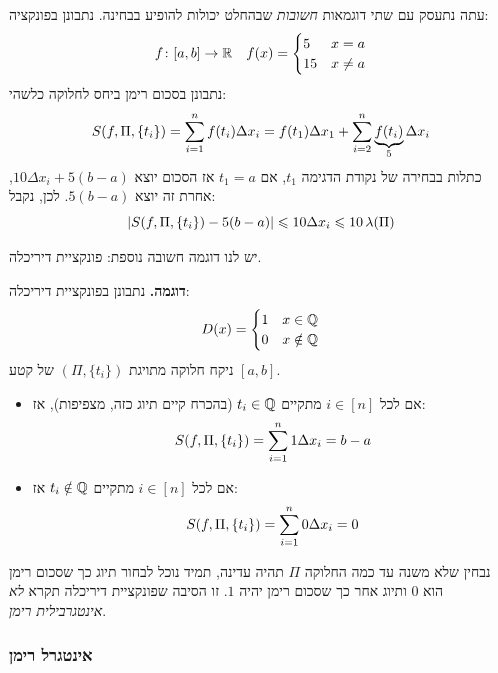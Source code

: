 \documentclass[name=רשימות חדו''א 2א]{../../../tex/classes/noChapterMegasumPreamble}
\begin{document}
	עתה נתעסק עם שתי דוגמאות \textit{חשובות} שבהחלט יכולות להופיע בבחינה. נתבונן בפונקציה:
	\begin{align*}
		f \colon [a, b] \to \mathbb{R} && f(x) = \begin{cases}
			5 & x = a \\
			15 & x \neq a
		\end{cases}
	\end{align*}
	נתבונן בסכום רימן ביחס לחלוקה כלשהי:
	\[ S(f, \Pi, \{t_i\}) = \sum_{i = 1}^{n}f(t_i)\Delta x_i = f(t_1)\Delta x_1 + \sum_{i = 2}^{n}\underbrace{f(t_i)}_{5}\Delta x_i \]
	כתלות בבחירה של נקודת הדגימה $t_1$, אם $t_1= a$ אז הסכום יוצא $10 \Delta x_i + 5(b - a)$, אחרת זה יוצא $5(b - a)$. לכן, נקבל:
	\[ \left \lvert S(f, \Pi, \{t_i\}) - 5(b - a) \right \rvert \leqslant 10 \Delta x_i \leqslant 10 \, \lambda(\Pi) \]

	יש לנו דוגמה חשובה נוספת: פונקציית דיריכלה. 

	\textbf{דוגמה. }נתבונן בפונקציית דיריכלה:
	\[ D(x) = \begin{cases}
		1 & x \in \mathbb{Q} \\
		0 & x \notin \mathbb{Q}
	\end{cases} \]
	ניקח חלוקה מתויגת $(\Pi, \{t_i\})$ של קטע $[a, b]$.
	\begin{itemize}
		\item אם לכל $i \in [n]$ מתקיים $t_i \in \mathbb{Q}$ (בהכרח קיים תיוג כזה, מצפיפות), אז:
		\[ S(f, \Pi, \{t_i\}) = \sum_{i = 1}^{n} 1 \Delta x_i = b - a \]
		\item אם לכל $i \in [n]$ מתקיים $t_i \notin \mathbb{Q}$ אז:
		\[ S(f, \Pi, \{t_i\}) = \sum_{i = 1}^{n} 0 \Delta x_i = 0 \]
	\end{itemize}
	נבחין שלא משנה עד כמה החלוקה $\Pi$ תהיה עדינה, תמיד נוכל לבחור תיוג כך שסכום רימן הוא $0$ ותיוג אחר כך שסכום רימן יהיה $1$. זו הסיבה שפונקציית דיריכלה תקרא \textit{לא אינטגרבילית רימן}. 


\subsubsection{אינטגרל רימן}
\end{document}
